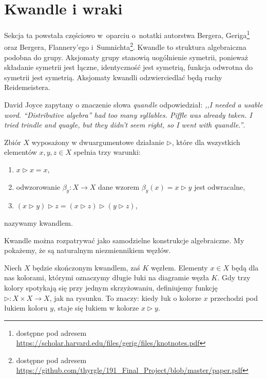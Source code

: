 
\section{Kwandle i wraki}

Sekcja ta powstała częściowo w~oparciu o~notatki autorstwa Bergera, Geriga\footnote{dostępne pod adresem \url{https://scholar.harvard.edu/files/gerig/files/knotnotes.pdf}} oraz Bergera, Flannery'ego i~Sumnichta\footnote{dostępne pod adresem \url{https://github.com/thyrgle/191_Final_Project/blob/master/paper.pdf}}.
%
%
%
%
Kwandle to struktura algebraiczna podobna do grupy.
Aksjomaty grupy stanowią uogólnienie symetrii, ponieważ składanie symetrii jest łączne, identyczność jest symetrią, funkcja odwrotna do symetrii jest symetrią.
Aksjomaty kwandli odzwierciedlać będą ruchy Reidemeistera.
%

David Joyce zapytany o znaczenie słowa \emph{quandle} odpowiedział: \emph{,,I needed a usable word. “Distributive algebra” had too many syllables. Piffle was already taken. I tried trindle and quagle, but they didn’t seem right, so I went with quandle.''}.
%

\begin{definition}[kwandel]
%
    Zbiór $X$ wyposażony w dwuargumentowe działanie $\triangleright$, które dla wszystkich elementów $x, y, z \in X$ spełnia trzy warunki:
    \begin{enumerate}
        \item $x \triangleright x = x$,
        \item odwzorowanie $\beta_y \colon X \to X$ dane wzorem $\beta_y(x) = x \triangleright y$ jest odwracalne,
        \item $(x \triangleright y) \triangleright z = (x \triangleright z) \triangleright (y \triangleright z)$,
    \end{enumerate}
    nazywamy kwandlem.
\end{definition}

Kwandle można rozpatrywać jako samodzielne konstrukcje algebraiczne.
My pokażemy, że są naturalnym niezmiennikiem węzłów.

Niech $X$ będzie skończonym kwandlem, zaś $K$ węzłem.
Elementy $x \in X$ będą dla nas kolorami, którymi oznaczymy długie łuki na diagramie węzła $K$.
Gdy trzy kolory spotykają się przy jednym skrzyżowaniu, definiujemy funkcję $\triangleright \colon X \times X \to X$, jak na rysunku.
To znaczy: kiedy łuk o kolorze $x$ przechodzi pod łukiem koloru $y$, staje się łukiem w kolorze $x \triangleright y$.
\begin{comment}
\[
    \LargeMinusCrossingQuandle
\]
\end{comment}

